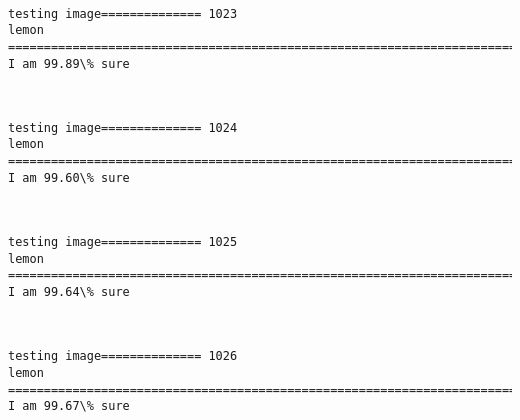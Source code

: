 \documentclass[11pt]{article}
\begin{document}
    \begin{center}
    \end{center}
    { \hspace*{\fill} \\}
    
    \begin{Verbatim}[commandchars=\\\{\}]
testing image============== 1023
lemon
============================================================================
I am 99.89\% sure

    \end{Verbatim}

    \begin{center}
    \end{center}
    { \hspace*{\fill} \\}
    
    \begin{Verbatim}[commandchars=\\\{\}]
testing image============== 1024
lemon
============================================================================
I am 99.60\% sure

    \end{Verbatim}

    \begin{center}
    \end{center}
    { \hspace*{\fill} \\}
    
    \begin{Verbatim}[commandchars=\\\{\}]
testing image============== 1025
lemon
============================================================================
I am 99.64\% sure

    \end{Verbatim}

    \begin{center}
    \end{center}
    { \hspace*{\fill} \\}
    
    \begin{Verbatim}[commandchars=\\\{\}]
testing image============== 1026
lemon
============================================================================
I am 99.67\% sure

    \end{Verbatim}
\end{document}
